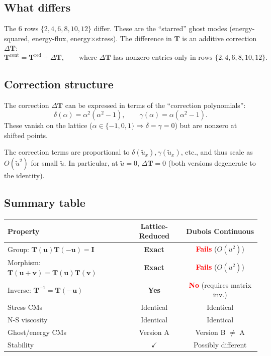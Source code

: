 \documentclass[11pt,a4paper]{article}
\newcommand{\vect}[1]{\bm{#1}}
\newcommand{\mat}[1]{\bm{#1}}
\newcommand{\Tmat}{\mat{T}}
\newcommand{\Imat}{\mat{I}}
\newcommand{\tu}{\tilde{u}}
\begin{document}
\subsection{What differs}

The 6 rows $\{2, 4, 6, 8, 10, 12\}$ differ.
These are the ``starred'' ghost modes (energy-squared, energy-flux, energy$\times$stress).
The difference in $\Tmat$ is an additive correction $\Delta\Tmat$:
\begin{equation}
  \Tmat^{\text{cont}} = \Tmat^{\text{red}} + \Delta\Tmat, \qquad \text{where } \Delta\Tmat \text{ has nonzero entries only in rows } \{2,4,6,8,10,12\}.
\end{equation}

\subsection{Correction structure}

The correction $\Delta\Tmat$ can be expressed in terms of the ``correction polynomials'':
\begin{equation}\label{eq:delta-gamma}
  \delta(\alpha) = \alpha^2(\alpha^2 - 1), \qquad \gamma(\alpha) = \alpha(\alpha^2 - 1).
\end{equation}
These vanish on the lattice ($\alpha \in \{-1,0,1\} \Rightarrow \delta = \gamma = 0$) but are nonzero at shifted points.

The correction terms are proportional to $\delta(\tu_x), \gamma(\tu_x)$, etc., and thus scale as $O(\tu^2)$ for small $\tu$.
In particular, at $\tu = 0$, $\Delta\Tmat = 0$ (both versions degenerate to the identity).

\subsection{Summary table}

\begin{center}
\renewcommand{\arraystretch}{1.3}
\begin{tabular}{lcc}
\toprule
Property & Lattice-Reduced & Dubois Continuous \\
\midrule
Group: $\Tmat(\vect{u})\Tmat(-\vect{u}) = \Imat$ & \textcolor{green!60!black}{\textbf{Exact}} & \textcolor{red}{\textbf{Fails}} ($O(u^2)$) \\
Morphism: $\Tmat(\vect{u}+\vect{v}) = \Tmat(\vect{u})\Tmat(\vect{v})$ & \textcolor{green!60!black}{\textbf{Exact}} & \textcolor{red}{\textbf{Fails}} ($O(u^2)$) \\
Inverse: $\Tmat^{-1} = \Tmat(-\vect{u})$ & \textcolor{green!60!black}{\textbf{Yes}} & \textcolor{red}{\textbf{No}} (requires matrix inv.) \\
Stress CMs & Identical & Identical \\
N-S viscosity & Identical & Identical \\
Ghost/energy CMs & Version A & Version B $\neq$ A \\
Stability & $\checkmark$ & Possibly different \\
\bottomrule
\end{tabular}
\end{center}
\end{document}
